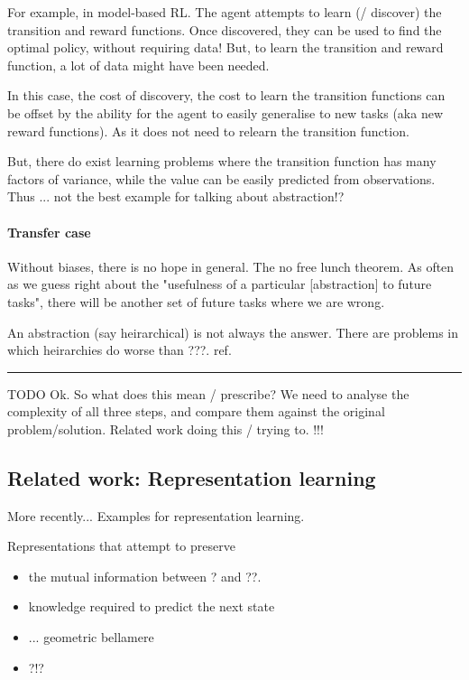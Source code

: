 For example, in model-based RL. The agent attempts to learn (/ discover) the
transition and reward functions. Once discovered, they can be used to find the optimal policy, without requiring data!
But, to learn the transition and reward function, a lot of data might have been needed.

In this case, the cost of discovery, the cost to learn the transition functions can be offset
by the ability for the agent to easily generalise to new tasks (aka new reward functions).
As it does not need to relearn the transition function.

But, there do exist learning problems where the transition function has many
factors of variance, while the value can be easily predicted from observations.
Thus ...
{\color{red}not the best example for talking about abstraction!?}

\paragraph{Transfer case}

Without biases, there is no hope in general. The no free lunch theorem.
As often as we guess right about the "usefulness of a particular [abstraction] to future tasks",
there will be another set of future tasks where we are wrong.

An abstraction (say heirarchical) is not always the answer. There are problems in which
heirarchies do worse than ???. ref.

\begin{center}\rule{0.5\linewidth}{\linethickness}\end{center}

{\color{red}TODO}
Ok. So what does this mean / prescribe?
We need to analyse the complexity of all three steps, and compare them against the
original problem/solution.
Related work doing this / trying to. !!!

\subsection{Related work: Representation learning}

More recently...
Examples for representation learning.

Representations that attempt to preserve
\begin{itemize}
\tightlist
  \item the mutual information between ? and ??.
  \item knowledge required to predict the next state
  \item ... geometric bellamere
  \item ?!?
\end{itemize}
